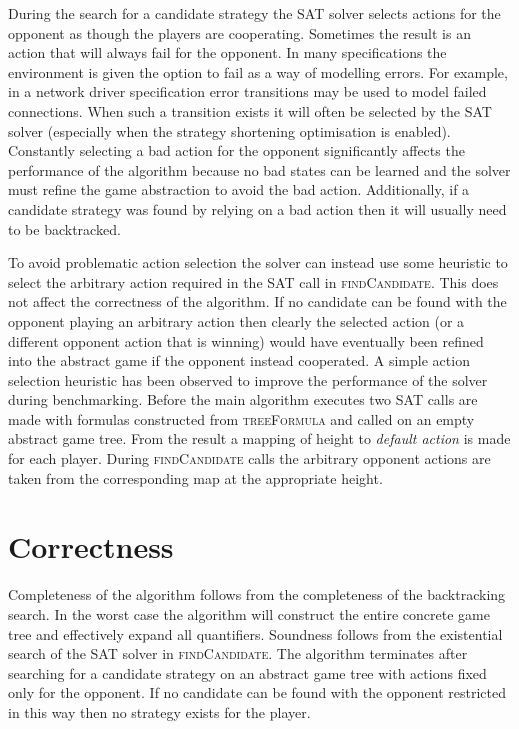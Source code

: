 During the search for a candidate strategy the SAT solver selects actions for the opponent as though the players are cooperating. Sometimes the result is an action that will always fail for the opponent. In many specifications the environment is given the option to fail as a way of modelling errors. For example, in a network driver specification error transitions may be used to model failed connections. When such a transition exists it will often be selected by the SAT solver (especially when the strategy shortening optimisation is enabled). Constantly selecting a bad action for the opponent significantly affects the performance of the algorithm because no bad states can be learned and the solver must refine the game abstraction to avoid the bad action. Additionally, if a candidate strategy was found by relying on a bad action then it will usually need to be backtracked. 

To avoid problematic action selection the solver can instead use some heuristic to select the arbitrary action required in the SAT call in \textsc{findCandidate}. This does not affect the correctness of the algorithm. If no candidate can be found with the opponent playing an arbitrary action then clearly the selected action (or a different opponent action that is winning) would have eventually been refined into the abstract game if the opponent instead cooperated. A simple action selection heuristic has been observed to improve the performance of the solver during benchmarking. Before the main algorithm executes two SAT calls are made with formulas constructed from \textsc{treeFormula} and \textsc{} called on an empty abstract game tree. From the result a mapping of height to \emph{default action} is made for each player. During \textsc{findCandidate} calls the arbitrary opponent actions are taken from the corresponding map at the appropriate height.

\section{Correctness}

Completeness of the algorithm follows from the completeness of the backtracking search. In the worst case the algorithm will construct the entire concrete game tree and effectively expand all quantifiers. Soundness follows from the existential search of the SAT solver in \textsc{findCandidate}. The algorithm terminates after searching for a candidate strategy on an abstract game tree with actions fixed only for the opponent. If no candidate can be found with the opponent restricted in this way then no strategy exists for the player.

